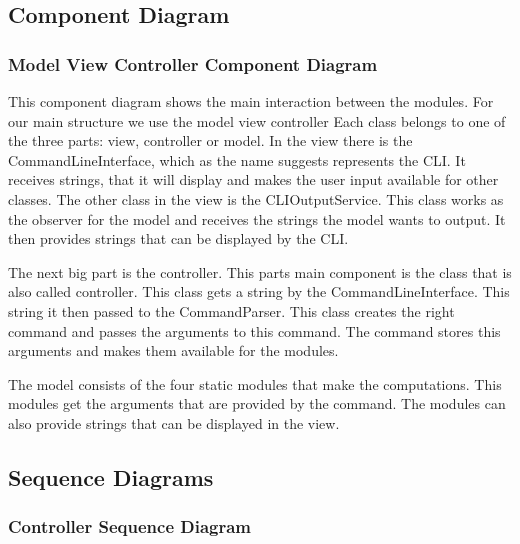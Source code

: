 \documentclass[parskip=full]{scrartcl}
\begin{document}
\newpage

\subsection{Component Diagram}

\subsubsection{Model View Controller Component Diagram}

\begin{figure}[h]
\begin{center}

\label{Model View Controller Component Diagram}
\end{center}
\end{figure}
\newpage

This component diagram shows the main interaction between the modules.
For our main structure we use the model view controller
Each class belongs to one of the three parts: view, controller or model.
In the view there is the CommandLineInterface, which as the name suggests represents the \gls{CLI}.
It receives strings, that it will display and makes the user input available for other classes.
The other class in the view is the CLIOutputService.
This class works as the observer for the model and receives the strings the model wants to output.
It then provides strings that can be displayed by the \gls{CLI}.

The next big part is the controller.
This parts main component is the class that is also called controller.
This class gets a string by the CommandLineInterface.
This string it then passed to the CommandParser.
This class creates the right command and passes the arguments to this command.
The command stores this arguments and makes them available for the modules.

The model consists of the four static modules that make the computations.
This modules get the arguments that are provided by the command.
The modules can also provide strings that can be displayed in the view.

\newpage

\subsection{Sequence Diagrams}

\subsubsection{Controller Sequence Diagram}
\end{document}
